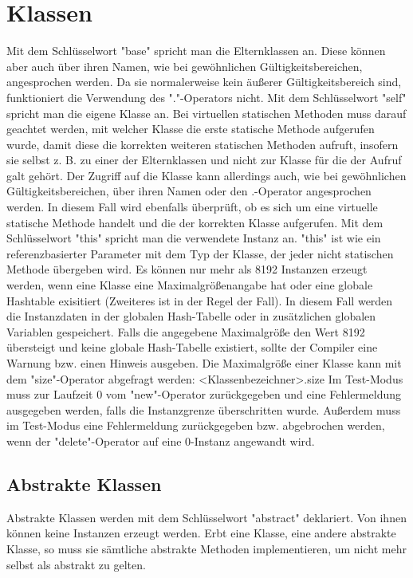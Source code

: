 \chapter{Klassen}
Mit dem Schlüsselwort "base" spricht man die Elternklassen an. Diese können aber auch über ihren Namen, wie bei gewöhnlichen
Gültigkeitsbereichen, angesprochen werden. Da sie normalerweise kein äußerer Gültigkeitsbereich sind, funktioniert die Verwendung des "."-Operators nicht.
Mit dem Schlüsselwort "self" spricht man die eigene Klasse an. Bei virtuellen statischen Methoden muss darauf geachtet werden, mit welcher Klasse
die erste statische Methode aufgerufen wurde, damit diese die korrekten weiteren statischen Methoden aufruft, insofern sie selbst z. B. zu einer
der Elternklassen und nicht zur Klasse für die der Aufruf galt gehört.
Der Zugriff auf die Klasse kann allerdings auch, wie bei gewöhnlichen Gültigkeitsbereichen, über ihren Namen oder den .-Operator angesprochen werden.
In diesem Fall wird ebenfalls überprüft, ob es sich um eine virtuelle statische Methode handelt und die der korrekten Klasse aufgerufen.
Mit dem Schlüsselwort "this" spricht man die verwendete Instanz an. "this" ist wie ein referenzbasierter Parameter mit dem Typ
der Klasse, der jeder nicht statischen Methode übergeben wird.
Es können nur mehr als 8192 Instanzen erzeugt werden, wenn eine Klasse eine Maximalgrößenangabe hat oder eine globale Hashtable exisitiert (Zweiteres ist in der Regel der Fall).
In diesem Fall werden die Instanzdaten in der globalen Hash-Tabelle oder in zusätzlichen globalen Variablen gespeichert.
Falls die angegebene Maximalgröße den Wert 8192 übersteigt und keine globale Hash-Tabelle existiert,
sollte der Compiler eine Warnung bzw. einen Hinweis ausgeben.
Die Maximalgröße einer Klasse kann mit dem "size"-Operator abgefragt werden: <Klassenbezeichner>.size
Im Test-Modus muss zur Laufzeit 0 vom "new"-Operator zurückgegeben und eine Fehlermeldung ausgegeben werden, falls die Instanzgrenze
überschritten wurde.
Außerdem muss im Test-Modus eine Fehlermeldung zurückgegeben bzw. abgebrochen werden, wenn der "delete"-Operator auf eine 0-Instanz angewandt wird.

\section{Abstrakte Klassen}
Abstrakte Klassen werden mit dem Schlüsselwort "abstract" deklariert. Von ihnen können keine
Instanzen erzeugt werden. Erbt eine Klasse, eine andere abstrakte Klasse, so muss sie sämtliche
abstrakte Methoden implementieren, um nicht mehr selbst als abstrakt zu gelten.

